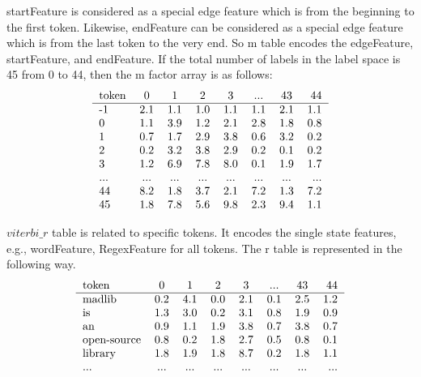   startFeature is considered as a special edge feature which is from the
  beginning to the first token. Likewise, endFeature can be considered
  as a special edge feature which is from the last token to the very end.
  So m table encodes the edgeFeature, startFeature, and endFeature.
  If the total number of labels in the label space is 45 from 0 to 44,
  then the m factor array is as follows:
  \[\begin{tabular}{l*{6}{c}r}
   token             & 0   & 1   & 2   & 3   & ... & 43 &  44 \\
   \hline
  -1                 & 2.1 & 1.1 & 1.0 & 1.1 & 1.1 & 2.1 & 1.1  \\
   0                 & 1.1 & 3.9 & 1.2 & 2.1 & 2.8 & 1.8 & 0.8  \\
   1                 & 0.7 & 1.7 & 2.9 & 3.8 & 0.6 & 3.2 & 0.2  \\
   2                 & 0.2 & 3.2 & 3.8 & 2.9 & 0.2 & 0.1 & 0.2  \\
   3                 & 1.2 & 6.9 & 7.8 & 8.0 & 0.1 & 1.9 & 1.7  \\
   ...               & ... & ... & ... & ... & ... & ... & ...  \\
   44                & 8.2 & 1.8 & 3.7 & 2.1 & 7.2 & 1.3 & 7.2  \\
   45                & 1.8 & 7.8 & 5.6 & 9.8 & 2.3 & 9.4 & 1.1  \\
  \end{tabular}\]
 
  $viterbi\_r$ table
  is related to specific tokens. It encodes the single state features,
  e.g., wordFeature, RegexFeature for all tokens. The r table is represented
  in the following way.\\
  \[\begin{tabular}{l*{6}{c}r}
   token             & 0   & 1   & 2   & 3   & ... & 43 &  44 \\
   \hline
   madlib            & 0.2 & 4.1 & 0.0 & 2.1 & 0.1 & 2.5 & 1.2  \\
   is                & 1.3 & 3.0 & 0.2 & 3.1 & 0.8 & 1.9 & 0.9  \\
   an                & 0.9 & 1.1 & 1.9 & 3.8 & 0.7 & 3.8 & 0.7  \\
   open-source       & 0.8 & 0.2 & 1.8 & 2.7 & 0.5 & 0.8 & 0.1  \\
   library           & 1.8 & 1.9 & 1.8 & 8.7 & 0.2 & 1.8 & 1.1  \\
   ...               & ... & ... & ... & ... & ... & ... & ...  \\
  \end{tabular}\]


